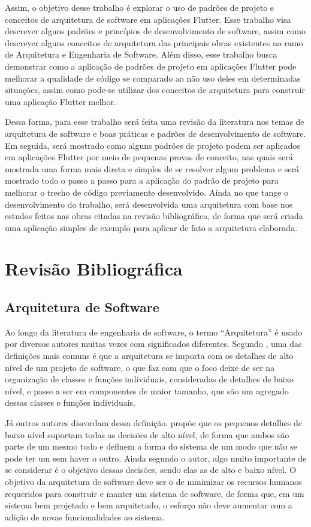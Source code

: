 \documentclass[12pt, %
openright, 
oneside, %
a4paper,    %
brazil]{facom-ufu-abntex2}
\begin{document}
Assim, o objetivo desse trabalho é explorar o uso de padrões de projeto e conceitos de arquitetura de software em aplicações Flutter. Esse trabalho visa descrever alguns padrões e princípios de desenvolvimento de software, assim como descrever alguns conceitos de arquitetura das principais obras existentes no ramo de Arquitetura e Engenharia de Software. Além disso, esse trabalho busca demonstrar como a aplicação de padrões de projeto em aplicações Flutter pode melhorar a qualidade de código se comparado ao não uso deles em determinadas situações, assim como pode-se utilizar dos conceitos de arquitetura para construir uma aplicação Flutter melhor.

Dessa forma, para esse trabalho será feita uma revisão da literatura nos temas de arquitetura de software e boas práticas e padrões de desenvolvimento de software. Em seguida, será mostrado como alguns padrões de projeto podem ser aplicados em aplicações Flutter por meio de pequenas provas de conceito, nas quais será mostrada uma forma mais direta e simples de se resolver algum problema e será mostrado todo o passo a passo para a aplicação do padrão de projeto para melhorar o trecho de código previamente desenvolvido. Ainda no que tange o desenvolvimento do trabalho, será desenvolvida uma arquitetura com base nos estudos feitos nas obras citadas na revisão bibliográfica, de forma que será criada uma aplicação simples de exemplo para aplicar de fato a arquitetura elaborada.

\chapter{Revisão Bibliográfica} \label{chapt:bibliography}

\section{Arquitetura de Software}
Ao longo da literatura de engenharia de software, o termo ``Arquitetura'' é usado por diversos autores muitas vezes com significados diferentes. Segundo , uma das definições mais comuns é que a arquitetura se importa com os detalhes de alto nível de um projeto de software, o que faz com que o foco deixe de ser na organização de classes e funções individuais, consideradas de detalhes de baixo nível, e passe a ser em componentes de maior tamanho, que são um agregado dessas classes e funções individuais.

Já outros autores discordam dessa definição.  propõe que os pequenos detalhes de baixo nível suportam todas as decisões de alto nível, de forma que ambos são parte de um mesmo todo e definem a forma do sistema de um modo que não se pode ter um sem haver o outro. Ainda segundo o autor, algo muito importante de se considerar é o objetivo dessas decisões, sendo elas as de alto e baixo nível. O objetivo da arquitetura de software deve ser o de minimizar os recursos humanos requeridos para construir e manter um sistema de software, de forma que, em um sistema bem projetado e bem arquitetado, o esforço não deve aumentar com a adição de novas funcionalidades ao sistema.
\end{document}
